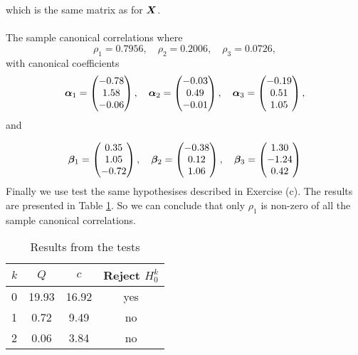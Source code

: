 which is the same matrix as for $\bm{X}$.\\
\\
The sample canonical correlations where 
\begin{equation*}
  \rho_{1} = 0.7956,\quad  \rho_{2} =   0.2006,\quad \rho_{3} =  0.0726,
\end{equation*}
with canonical coefficients
\begin{equation*}
  \bm{\alpha}_{1} =
  \begin{pmatrix}
    -0.78 \\ 
    1.58 \\ 
    -0.06 
  \end{pmatrix}, \quad
  \bm{\alpha}_{2} =
  \begin{pmatrix}
    -0.03 \\ 
    0.49 \\ 
    -0.01
  \end{pmatrix}, \quad
  \bm{\alpha}_{3} =
  \begin{pmatrix}
    -0.19 \\ 
    0.51 \\ 
    1.05  
  \end{pmatrix},
\end{equation*}
and

\begin{equation*}
  \bm{\beta}_{1} =
  \begin{pmatrix}
    0.35 \\ 
    1.05 \\ 
    -0.72  
  \end{pmatrix}, \quad
  \bm{\beta}_{2} =
  \begin{pmatrix}
    -0.38 \\ 
    0.12 \\ 
    1.06  
  \end{pmatrix}, \quad
  \bm{\beta}_{3} =
  \begin{pmatrix}
    1.30 \\ 
    -1.24 \\ 
    0.42  
  \end{pmatrix}
\end{equation*}
Finally we use test the same hypothesises described in Exercise
(c). The results are presented in Table
\ref{tab:test_ex11_standardized}. So we can conclude that only
$\rho_{1}$ is non-zero of all the sample canonical correlations. 
\begin{table}
  \centering
  \begin{tabular}{l|ccc}
    $k$&$Q$&$c$& Reject $H_{0}^{k}$ \\ \hline
    0 &19.93 &16.92 & yes \\ 
    1 &0.72 &9.49 & no \\ 
    2 &0.06 &3.84 & no  
  \end{tabular}
  \caption{Results from the tests}
  \label{tab:test_ex11_standardized}
\end{table} 
